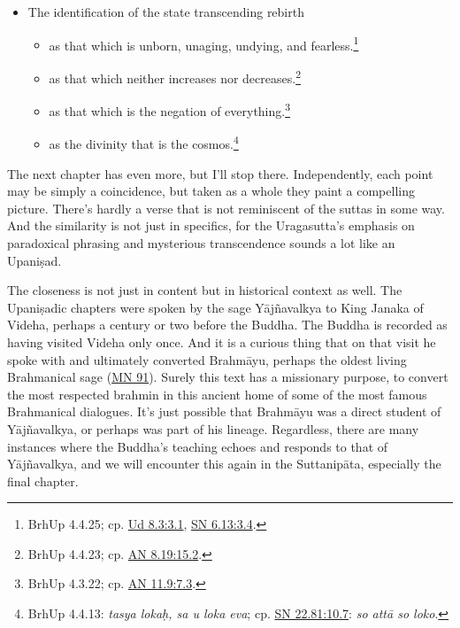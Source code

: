 \documentclass[12pt,openany]{book}%
\begin{document}
\begin{itemize}
\item The identification of the state transcending rebirth
\begin{itemize}%
\item as that which is unborn, unaging, undying, and fearless.\footnote{BrhUp 4.4.25; cp. \href{https://suttacentral.net/ud8.3/en/sujato\#3.1}{Ud 8.3:3.1}, \href{https://suttacentral.net/sn6.13/en/sujato\#3.4}{SN 6.13:3.4}. }%
\item as that which neither increases nor decreases.\footnote{BrhUp 4.4.23; cp. \href{https://suttacentral.net/an8.19/en/sujato\#15.2}{AN 8.19:15.2}. }%
\item as that which is the negation of everything.\footnote{BrhUp 4.3.22; cp. \href{https://suttacentral.net/an11.9/en/sujato\#7.3}{AN 11.9:7.3}. }%
\item as the divinity that is the cosmos.\footnote{BrhUp 4.4.13: \textit{tasya lokaḥ, sa u loka eva}; cp. \href{https://suttacentral.net/sn22.81/en/sujato\#10.7}{SN 22.81:10.7}: \textit{so \textsanskrit{attā} so loko}. }%
\end{itemize}

%
\end{itemize}

The next chapter has even more, but I’ll stop there. Independently, each point may be simply a coincidence, but taken as a whole they paint a compelling picture. There’s hardly a verse that is not reminiscent of the suttas in some way. And the similarity is not just in specifics, for the Uragasutta’s emphasis on paradoxical phrasing and mysterious transcendence sounds a lot like an \textsanskrit{Upaniṣad}.

The closeness is not just in content but in historical context as well. The \textsanskrit{Upaniṣadic} chapters were spoken by the sage \textsanskrit{Yājñavalkya} to King Janaka of Videha, perhaps a century or two before the Buddha. The Buddha is recorded as having visited Videha only once. And it is a curious thing that on that visit he spoke with and ultimately converted \textsanskrit{Brahmāyu}, perhaps the oldest living Brahmanical sage (\href{https://suttacentral.net/mn91/en/sujato}{MN 91}). Surely this text has a missionary purpose, to convert the most respected brahmin in this ancient home of some of the most famous Brahmanical dialogues. It’s just possible that \textsanskrit{Brahmāyu} was a direct student of \textsanskrit{Yājñavalkya}, or perhaps was part of his lineage. Regardless, there are many instances where the Buddha’s teaching echoes and responds to that of \textsanskrit{Yājñavalkya}, and we will encounter this again in the \textsanskrit{Suttanipāta}, especially the final chapter.
\end{document}
